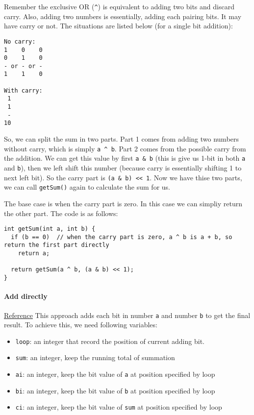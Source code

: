 \documentclass[12pt]{article}
\begin{document}
Remember the exclusive OR (\texttt{\textasciicircum{}}) is equivalent to adding two bits and discard carry. Also, adding two numbers is essentially, adding each pairing bits. It may have carry or not. The situations are listed below (for a single bit addition):
\begin{verbatim}
No carry:
1    0    0
0    1    0
- or - or -
1    1    0

With carry:
 1
 1
 -
10
\end{verbatim}
So, we can split the sum in two parts. Part 1 comes from adding two numbers without carry, which is simply \texttt{a \textasciicircum{} b}. Part 2 comes from the possible carry from the addition. We can get this value by first \texttt{a \& b} (this is give us 1-bit in both \texttt{a} and \texttt{b}), then we left shift this number (because carry is essentially shifting 1 to next left bit). So the carry part is \texttt{(a \& b) << 1}. Now we have thise two parts, we can call \texttt{getSum()} again to calculate the sum for us.

The base case is when the carry part is zero. In this case we can simpliy return the other part. The code is as follows:
\begin{verbatim}
int getSum(int a, int b) {
  if (b == 0)  // when the carry part is zero, a ^ b is a + b, so return the first part directly
    return a;

  return getSum(a ^ b, (a & b) << 1);
}
\end{verbatim}
\paragraph{Add directly}
\label{sec:orge9beafd}
\href{https://stackoverflow.com/questions/700410/subtraction-without-minus-sign}{Reference}
This approach adds each bit in number \texttt{a} and number \texttt{b} to get the final result. To achieve this, we need following variables:
\begin{itemize}
\item \texttt{loop}: an integer that record the position of current adding bit.
\item \texttt{sum}: an integer, keep the running total of summation
\item \texttt{ai}: an integer, keep the bit value of \texttt{a} at position specified by loop
\item \texttt{bi}: an integer, keep the bit value of \texttt{b} at position specified by loop
\item \texttt{ci}: an integer, keep the bit value of \texttt{sum} at position specified by loop
\end{itemize}
\end{document}
